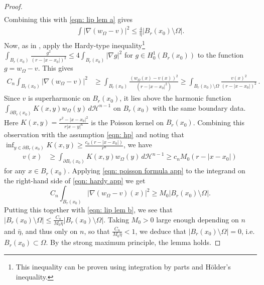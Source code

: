 \documentclass[10pt, reqno]{amsart}
\numberwithin{equation}{section}
\def\W{\Omega}
\def\pa{{\partial}}
\begin{document}
\begin{proof}
\begin{align*}
\end{align*}
Combining this with \eqref{eqn: lip lem a} gives
\begin{align}\label{eqn: lip lem b}
	\int  |\nabla( w_\W - v)|^2 \leq \frac{4}{\bar\eta}|B_r(x_0) \setminus\W|.
\end{align}
Now, as in \cite[Lemma 5.10]{DPMMCapacity}, apply the Hardy-type inequality\footnote{ This inequality can be proven using integration by parts and H\"{o}lder's inequality.} $\int_{B_r(x_0)}\frac{g^2}{(r- |x-x_0|)^2 } \leq 4 \int_{B_r(x_0)} |\nabla g|^2$ for $g \in H^1_0(B_r(x_0))$ to the function $g = w_\W -v$. This gives 
\begin{align}\label{eqn: hardy app}
	C_n \int_{B_r(x_0)} |\nabla (w_\W - v)|^2 & \geq 	\int_{B_r(x_0)}\frac{(w_\W(x) - v(x)) ^2}{(r- |x-x_0|^2) } \geq \int_{B_r(x_0)\setminus \W}\frac{v(x)^2}{(r- |x-x_0|)^2}\,.
\end{align}
Since $v$ is superharmonic on $B_r(x_0)$, it lies above the harmonic function $\int_{\pa B_r(x_0)}K(x,y) w_\W(y) \, d\mathcal{H}^{n-1}$ on $B_r(x_0)$ with the same boundary data. Here $K(x,y) = \frac{r^2- |x-x_0|^2}{r |x-y|^n}$ is the Poisson kernel on $B_r(x_0)$. Combining this observation with the assumption \eqref{eqn: hp} and noting that $\inf_{y \in \pa B_r(x_0)}K(x,y)\geq \frac{c_n (r-|x- x_0|)}{r^n}$, we have
\begin{align}\label{eqn: poisson formula app}
{v(x)} &  \geq \int_{\pa B_r(x_0)}K(x,y) w_\W(y) \, d\mathcal{H}^{n-1} \geq
	 c_n M_0 (r-|x-x_0|)\,
\end{align}
for any $x \in 
 B_r(x_0).$
Applying \eqref{eqn: poisson formula app} to the integrand on the right-hand side of \eqref{eqn: hardy app} we get 
\begin{equation}\label{eqn: upper denisity in terms of harm replacement}
C_n \int_{B_r(x_0)} |\nabla (w_\W - v)(x)|^2 
\geq   M_0 |B_r(x_0) \setminus \Omega|.
\end{equation}
Putting this together with \eqref{eqn: lip lem b}, we see that $|B_r(x_0)\setminus \W | \leq \frac{C_n}{M_0\bar\eta}|B_r(x_0)\setminus \W |$. Taking $M_0>0$ large enough depending on $n$ and $\bar\eta$, and thus only on $n$, so that $\frac{C_n}{M_0\bar\eta} <1$, we deduce that $|B_r(x_0)\setminus \W |=0$, i.e. $B_r(x_0)\subset \W$. By the strong maximum principle, the lemma holds.
\end{proof}
\end{document}
